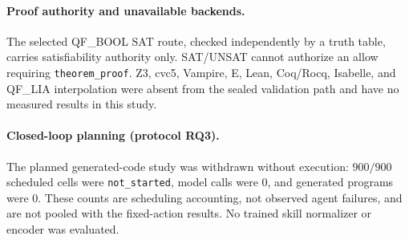 \paragraph{Proof authority and unavailable backends.}
The selected QF\_BOOL SAT route, checked independently by a truth table, carries satisfiability authority only. SAT/UNSAT cannot authorize an allow requiring \texttt{theorem\_proof}. Z3, cvc5, Vampire, E, Lean, Coq/Rocq, Isabelle, and QF\_LIA interpolation were absent from the sealed validation path and have no measured results in this study.

\paragraph{Closed-loop planning (protocol RQ3).}
The planned generated-code study was withdrawn without execution: $900/900$ scheduled cells were \texttt{not\_started}, model calls were $0$, and generated programs were $0$. These counts are scheduling accounting, not observed agent failures, and are not pooled with the fixed-action results. No trained skill normalizer or encoder was evaluated.
